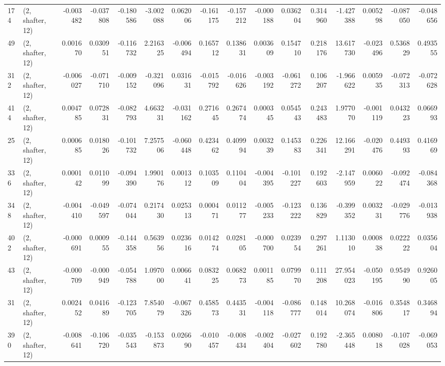 \begin{tabular}{llrrrrrrrrrrrrrr}
174 &  (2, shafter, 12) &  -0.003482 & -0.037808 & -0.180586 &   -3.002088 &  0.062006 &  -0.161175 & -0.157212 & -0.000188 &  0.036204 &  0.314960 &   -1.427388 &  0.005298 & -0.087050 & -0.048656 \\
49  &  (2, shafter, 12) &   0.001670 &  0.030951 & -0.116732 &    2.216325 & -0.006494 &   0.165712 &  0.138631 &  0.003609 &  0.154710 &  0.218176 &   13.617730 & -0.023496 &  0.536829 &  0.493555 \\
312 &  (2, shafter, 12) &  -0.006027 & -0.071710 & -0.009152 &   -0.321096 &  0.031631 &  -0.015792 & -0.016626 & -0.003192 & -0.061272 &  0.106207 &   -1.966622 &  0.005935 & -0.072313 & -0.072628 \\
414 &  (2, shafter, 12) &   0.004785 &  0.072831 & -0.082793 &    4.663231 & -0.031162 &   0.271645 &  0.267474 &  0.000345 &  0.054543 &  0.243483 &    1.977070 & -0.001119 &  0.043223 &  0.066993 \\
25  &  (2, shafter, 12) &   0.000685 &  0.018026 & -0.101732 &    7.257506 & -0.060448 &   0.423462 &  0.409994 &  0.003239 &  0.145383 &  0.226341 &   12.166291 & -0.020476 &  0.449393 &  0.416969 \\
336 &  (2, shafter, 12) &   0.000142 &  0.011099 & -0.094390 &    1.990176 &  0.001312 &   0.103509 &  0.110404 & -0.004395 & -0.101227 &  0.192603 &   -2.147959 &  0.006022 & -0.092474 & -0.084368 \\
348 &  (2, shafter, 12) &  -0.004410 & -0.049597 & -0.074044 &    0.217430 &  0.025313 &   0.000471 &  0.011277 & -0.005233 & -0.123222 &  0.136829 &   -0.399352 &  0.003231 & -0.029776 & -0.013938 \\
402 &  (2, shafter, 12) &  -0.000691 &  0.000955 & -0.144358 &    0.563956 &  0.023616 &   0.014274 &  0.028105 & -0.000700 &  0.023954 &  0.297261 &    1.113010 &  0.000838 &  0.022222 &  0.035604 \\
43  &  (2, shafter, 12) &  -0.000709 & -0.000949 & -0.054788 &    1.097000 &  0.006641 &   0.083225 &  0.068273 &  0.001185 &  0.079970 &  0.111208 &   27.954023 & -0.050195 &  0.954990 &  0.926005 \\
31  &  (2, shafter, 12) &   0.002452 &  0.041689 & -0.123705 &    7.854079 & -0.067326 &   0.458573 &  0.443531 & -0.004118 & -0.086777 &  0.148014 &   10.268074 & -0.016806 &  0.354817 &  0.346894 \\
390 &  (2, shafter, 12) &  -0.008641 & -0.106720 & -0.035543 &   -0.153873 &  0.026690 &  -0.010457 & -0.008434 & -0.002404 & -0.027602 &  0.192780 &   -2.365448 &  0.008018 & -0.107028 & -0.069053 \\

\end{tabular}
